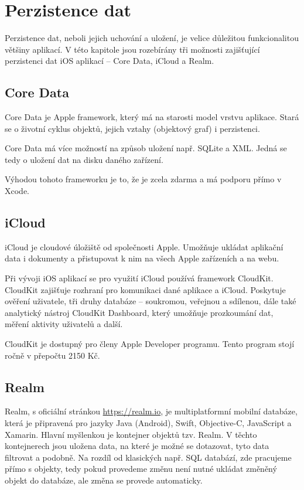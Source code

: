 \documentclass[thesis=M,czech]{FITthesis}[2012/06/26]
\begin{document}
\section{Perzistence dat}
Perzistence dat, neboli jejich uchování a uložení, je velice důležitou funkcionalitou většiny aplikací. V této kapitole jsou rozebírány tři možnosti zajišťující perzistenci dat iOS aplikací -- Core Data, iCloud a Realm.

\subsection{Core Data}
Core Data je Apple framework, který má na starosti model vrstvu aplikace. Stará se o životní cyklus objektů, jejich vztahy (objektový graf) i perzistenci. \cite{coredata}

Core Data má více možností na způsob uložení např. SQLite a XML. Jedná se tedy o uložení dat na disku daného zařízení.  \cite{CoreDataPersistentTypes}

Výhodou tohoto frameworku je to, že je zcela zdarma a má podporu přímo v Xcode. \cite{CoreDataXcode}

\subsection{iCloud}
iCloud je cloudové úložiště od společnosti Apple. Umožňuje ukládat aplikační data i dokumenty a přistupovat k nim na všech Apple zařízeních a na webu. \cite{iCloud}

Při vývoji iOS aplikací se pro využití iCloud používá framework CloudKit. CloudKit zajišťuje rozhraní pro komunikaci dané aplikace a iCloud. \cite{CloudKitDoc} Poskytuje ověření uživatele, tři druhy databáze -- soukromou, veřejnou a sdílenou, dále také analytický nástroj CloudKit Dashboard, který umožňuje prozkoumání dat, měření aktivity uživatelů a další. \cite{CloudKit}

CloudKit je dostupný pro členy Apple Developer programu. \cite{AppleDeveloperProgram} Tento program stojí ročně v přepočtu 2150 Kč. \cite{AppleDeveloperProgramPrice} 

\subsection{Realm}
Realm, s oficiální stránkou \url{https://realm.io}, je multiplatformní mobilní databáze, která je připravená pro jazyky Java (Android), Swift, Objective-C, JavaScript a Xamarin. Hlavní myšlenkou je kontejner objektů tzv. Realm. V těchto kontejnerech jsou uložena data, na které je možné se dotazovat, tyto data filtrovat a podobně. Na rozdíl od klasických např. SQL databází, zde pracujeme přímo s  objekty, tedy pokud provedeme změnu není nutné ukládat změněný objekt do databáze, ale změna se provede automaticky.
\end{document}
